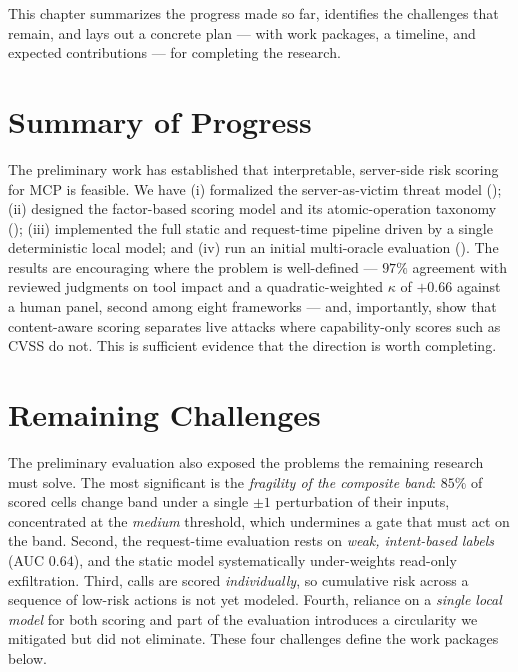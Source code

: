 This chapter summarizes the progress made so far, identifies the challenges that
remain, and lays out a concrete plan --- with work packages, a timeline, and
expected contributions --- for completing the research.

\section{Summary of Progress}
\label{sec:plan:progress}

The preliminary work has established that interpretable, server-side risk scoring
for MCP is feasible. We have (i) formalized the server-as-victim threat model
(); (ii) designed the factor-based scoring model
and its atomic-operation taxonomy ();
(iii) implemented the full static and request-time pipeline driven by a single
deterministic local model; and (iv) run an initial multi-oracle evaluation
(). The results are encouraging where the problem is
well-defined --- $97\%$ agreement with reviewed judgments on tool impact and a
quadratic-weighted $\kappa$ of $+0.66$ against a human panel, second among eight
frameworks --- and, importantly, show that content-aware scoring separates live
attacks where capability-only scores such as CVSS do not. This is sufficient
evidence that the direction is worth completing.

\section{Remaining Challenges}
\label{sec:plan:challenges}

The preliminary evaluation also exposed the problems the remaining research must
solve. The most significant is the \emph{fragility of the composite band}:
$85\%$ of scored cells change band under a single $\pm1$ perturbation of their
inputs, concentrated at the \textit{medium} threshold, which undermines a gate
that must act on the band. Second, the request-time evaluation rests on
\emph{weak, intent-based labels} (AUC $0.64$), and the static model
systematically under-weights read-only exfiltration. Third, calls are scored
\emph{individually}, so cumulative risk across a sequence of low-risk actions is
not yet modeled. Fourth, reliance on a \emph{single local model} for both scoring
and part of the evaluation introduces a circularity we mitigated but did not
eliminate. These four challenges define the work packages below.

